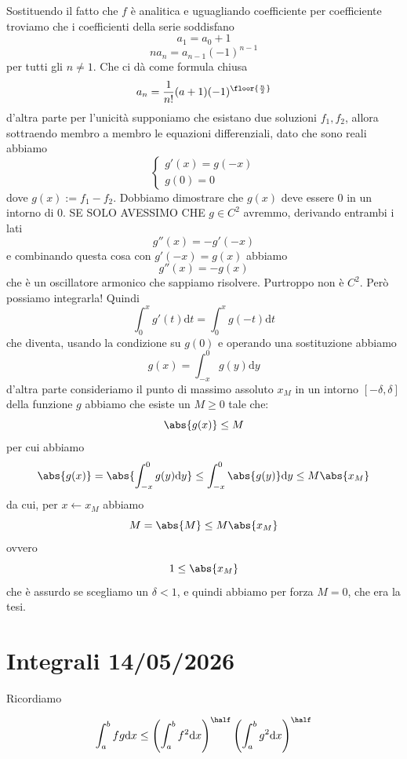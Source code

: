 \documentclass[11pt]{scrartcl}
\newcommand{\dif}{\text{d}}
\begin{document}
	\begin{answer}[Problema 3]
		Sostituendo il fatto che $f$ è analitica e uguagliando coefficiente per coefficiente troviamo che i coefficienti della serie soddisfano
		$$a_1=a_0+1$$
		$$na_n=a_{n-1}(-1)^{n-1}$$
		per tutti gli $n\ne 1$. Che ci dà come formula chiusa 
		$$a_n=\frac{1}{n!}(a+1)(-1)^{\floor{\frac{n}{2}}}$$
		d'altra parte per l'unicità supponiamo che esistano due soluzioni $f_1,f_2$, allora sottraendo membro a membro le equazioni differenziali, dato che sono reali abbiamo
		$$
		\begin{cases}
			g'(x)=g(-x)\\
			g(0)=0
		\end{cases}
		$$
		dove $g(x):=f_1-f_2$. Dobbiamo dimostrare che $g(x)$ deve essere $0$ in un intorno di $0$. SE SOLO AVESSIMO CHE $g\in C^2$ avremmo, derivando entrambi i lati
		$$g''(x)=-g'(-x)$$
		e combinando questa cosa con $g'(-x)=g(x)$ abbiamo
		$$g''(x)=-g(x)$$
		che è un oscillatore armonico che sappiamo risolvere. Purtroppo non è $C^2$. Però possiamo integrarla! Quindi
		$$\int_0^x g'(t)\dif t=\int_0^x g(-t)\dif t$$
		che diventa, usando la condizione su $g(0)$ e operando una sostituzione abbiamo
		$$g(x)=\int_{-x}^0 g(y)\dif y$$
		d'altra parte consideriamo il punto di massimo assoluto $x_M$ in un intorno $[-\delta,\delta]$ della funzione $g$ abbiamo che esiste un $M\ge 0$ tale che:
		$$\abs{g(x)}\le M$$
		per cui abbiamo 
		$$\abs{g(x)}=\abs{\int_{-x}^0g(y)\dif y}\le \int_{-x}^0 \abs{g(y)}\dif y\le M\abs{x_M}$$
		da cui, per $x\gets x_M$ abbiamo
		$$M=\abs{M}\le M\abs{x_M}$$
		ovvero
		$$1\le \abs{x_M}$$
		che è assurdo se scegliamo un $\delta<1$, e quindi abbiamo per forza $M=0$, che era la tesi. 
	\end{answer}
	
	\newpage
	
	\section{Integrali 14/05/2026}
	Ricordiamo
	\begin{theorem}
		$$\int_a^b fg\dif x\le \left(\int_a^b f^2\dif x\right)^{\half}\left(\int_a^b g^2\dif x\right)^{\half}$$
	\end{theorem}
\end{document}
